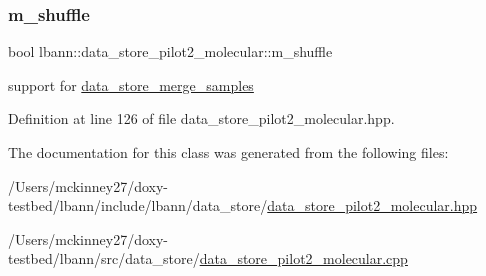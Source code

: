 \subsubsection{\texorpdfstring{m\+\_\+shuffle}{m\_shuffle}}
{\footnotesize\ttfamily bool lbann\+::data\+\_\+store\+\_\+pilot2\+\_\+molecular\+::m\+\_\+shuffle\hspace{0.3cm}{\ttfamily [protected]}}



support for \hyperlink{classlbann_1_1data__store__merge__samples}{data\+\_\+store\+\_\+merge\+\_\+samples} 



Definition at line 126 of file data\+\_\+store\+\_\+pilot2\+\_\+molecular.\+hpp.



The documentation for this class was generated from the following files\+:\begin{DoxyCompactItemize}
\item 
/\+Users/mckinney27/doxy-\/testbed/lbann/include/lbann/data\+\_\+store/\hyperlink{data__store__pilot2__molecular_8hpp}{data\+\_\+store\+\_\+pilot2\+\_\+molecular.\+hpp}\item 
/\+Users/mckinney27/doxy-\/testbed/lbann/src/data\+\_\+store/\hyperlink{data__store__pilot2__molecular_8cpp}{data\+\_\+store\+\_\+pilot2\+\_\+molecular.\+cpp}\end{DoxyCompactItemize}
